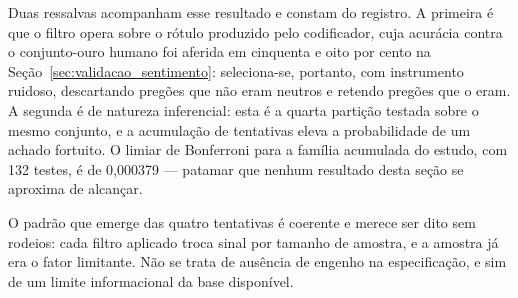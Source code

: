 Duas ressalvas acompanham esse resultado e constam do registro. A primeira é que o filtro opera
sobre o rótulo produzido pelo codificador, cuja acurácia contra o conjunto-ouro humano foi aferida
em cinquenta e oito por cento na Seção~\ref{sec:validacao_sentimento}: seleciona-se, portanto, com
instrumento ruidoso, descartando pregões que não eram neutros e retendo pregões que o eram. A
segunda é de natureza inferencial: esta é a quarta partição testada sobre o mesmo conjunto, e a
acumulação de tentativas eleva a probabilidade de um achado fortuito. O limiar de Bonferroni para a
família acumulada do estudo, com 132 testes, é de 0{,}000379 --- patamar que
nenhum resultado desta seção se aproxima de alcançar.

O padrão que emerge das quatro tentativas é coerente e merece ser dito sem rodeios: cada filtro
aplicado troca sinal por tamanho de amostra, e a amostra já era o fator limitante. Não se trata de
ausência de engenho na especificação, e sim de um limite informacional da base disponível.
